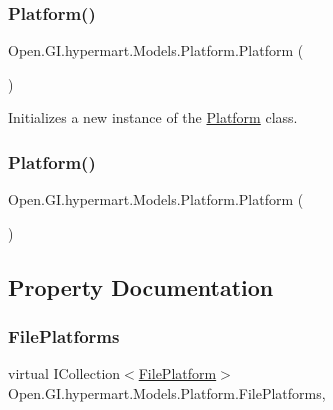 \subsubsection{\texorpdfstring{Platform()}{Platform()}\hspace{0.1cm}{\footnotesize\ttfamily [1/2]}}
{\footnotesize\ttfamily Open.\+G\+I.\+hypermart.\+Models.\+Platform.\+Platform (\begin{DoxyParamCaption}{ }\end{DoxyParamCaption})}



Initializes a new instance of the \hyperlink{class_open_1_1_g_i_1_1hypermart_1_1_models_1_1_platform}{Platform} class. 

\hypertarget{class_open_1_1_g_i_1_1hypermart_1_1_models_1_1_platform_a6c806705f4dc1171773096a5249a1563}{}\label{class_open_1_1_g_i_1_1hypermart_1_1_models_1_1_platform_a6c806705f4dc1171773096a5249a1563} 
\subsubsection{\texorpdfstring{Platform()}{Platform()}\hspace{0.1cm}{\footnotesize\ttfamily [2/2]}}
{\footnotesize\ttfamily Open.\+G\+I.\+hypermart.\+Models.\+Platform.\+Platform (\begin{DoxyParamCaption}{ }\end{DoxyParamCaption})}



\subsection{Property Documentation}
\hypertarget{class_open_1_1_g_i_1_1hypermart_1_1_models_1_1_platform_ac358f8b1b556f6d99fb47fdb29de7202}{}\label{class_open_1_1_g_i_1_1hypermart_1_1_models_1_1_platform_ac358f8b1b556f6d99fb47fdb29de7202} 
\subsubsection{\texorpdfstring{File\+Platforms}{FilePlatforms}}
{\footnotesize\ttfamily virtual I\+Collection$<$\hyperlink{class_open_1_1_g_i_1_1hypermart_1_1_models_1_1_file_platform}{File\+Platform}$>$ Open.\+G\+I.\+hypermart.\+Models.\+Platform.\+File\+Platforms\hspace{0.3cm}{\ttfamily [get]}, {\ttfamily [set]}}

